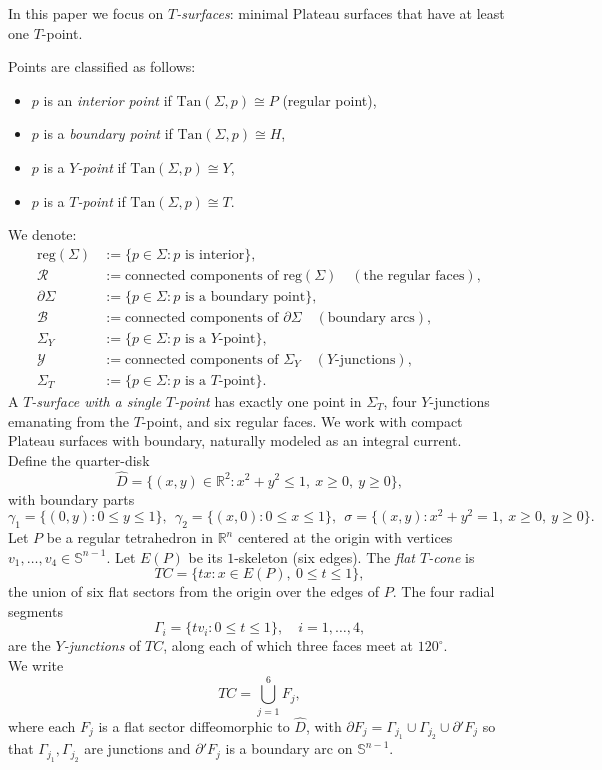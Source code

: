 \documentclass[11pt]{amsart}
\numberwithin{equation}{section}
\theoremstyle{theorem}
\theoremstyle{definition}
\numberwithin{equation}{section}
\begin{document}
In this paper we focus on \emph{$T$-surfaces}: minimal Plateau surfaces that have at least one $T$-point.

Points are classified as follows:
\begin{itemize}
    \item $p$ is an \emph{interior point} if $\mathrm{Tan}(\Sigma, p) \cong P$ (regular point),
    \item $p$ is a \emph{boundary point} if $\mathrm{Tan}(\Sigma, p) \cong H$,
    \item $p$ is a \emph{$Y$-point} if $\mathrm{Tan}(\Sigma, p) \cong Y$,
    \item $p$ is a \emph{$T$-point} if $\mathrm{Tan}(\Sigma, p) \cong T$.
\end{itemize}

We denote:
\begin{align*}
    \mathrm{reg}(\Sigma) &:= \{p \in \Sigma : p \text{ is interior}\}, \\
    \mathcal{R} &:= \text{connected components of } \mathrm{reg}(\Sigma) \quad (\text{the regular faces}), \\
    \partial \Sigma &:= \{p \in \Sigma : p \text{ is a boundary point}\}, \\
    \mathcal{B} &:= \text{connected components of } \partial \Sigma \quad (\text{boundary arcs}), \\
    \Sigma_Y &:= \{p \in \Sigma : p \text{ is a } Y\text{-point}\}, \\
    \mathcal{Y} &:= \text{connected components of } \Sigma_Y \quad (\text{$Y$-junctions}), \\
    \Sigma_T &:= \{p \in \Sigma : p \text{ is a } T\text{-point}\}.
\end{align*}
A \emph{$T$-surface with a single $T$-point} has exactly one point in $\Sigma_T$, four $Y$-junctions emanating from the $T$-point, and six regular faces. We work with compact Plateau surfaces with boundary, naturally modeled as an integral current.\\
Define the quarter-disk
\[
\hat{D} = \{ (x,y) \in \mathbb{R}^2 : x^2 + y^2 \leq 1,\ x \geq 0,\ y \geq 0 \},
\]
with boundary parts
$$\gamma_1 = \{ (0,y) : 0 \leq y \leq 1 \},\ \
\gamma_2 = \{ (x,0) : 0 \leq x \leq 1 \},\ \
\sigma = \{ (x,y) : x^2 + y^2 = 1,\ x \geq 0,\ y \geq 0 \}.$$
Let $P$ be a regular tetrahedron in $\mathbb{R}^n$ centered at the origin with vertices $v_1,\dots,v_4 \in \mathbb{S}^{n-1}$. Let $E(P)$ be its $1$-skeleton (six edges). The \emph{flat $T$-cone} is
\[
TC = \{ t x : x \in E(P),\ 0 \leq t \leq 1 \},
\]
the union of six flat sectors from the origin over the edges of $P$. The four radial segments
\[
\Gamma_i = \{ t v_i : 0 \leq t \leq 1 \}, \quad i=1,\dots,4,
\]
are the \emph{$Y$-junctions} of $TC$, along each of which three faces meet at $120^\circ$.\\
We write 
$$TC = \bigcup_{j=1}^6 F_j,$$ where each $F_j$ is a flat sector diffeomorphic to $\hat{D}$, with $\partial F_j = \Gamma_{j_1} \cup \Gamma_{j_2} \cup \partial' F_j$ so that $\Gamma_{j_1},\Gamma_{j_2}$ are junctions and $\partial' F_j$ is a boundary arc on $\mathbb{S}^{n-1}$.
\end{document}
